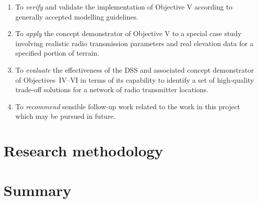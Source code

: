 \begin{enumerate}[label=\Roman*]
 \item To \textit{verify} and validate the implementation of Objective V according to generally accepted modelling guidelines.
 \item To \textit{apply} the concept demonstrator of Objective V to a special case study involving realistic radio transmission parameters and real elevation data for a specified portion of terrain.
 \item To \textit{evaluate} the effectiveness of the DSS and associated concept demonstrator of Objectives~IV--VI in terms of its capability to identify a set of high-quality trade-off solutions for a network of radio transmitter locations.
 \item To \textit{recommend} sensible follow-up work related to the work in this project which may be pursued in future.
\end{enumerate}

\section{Research methodology}
\blindtext

\section{Summary}
\blindtext